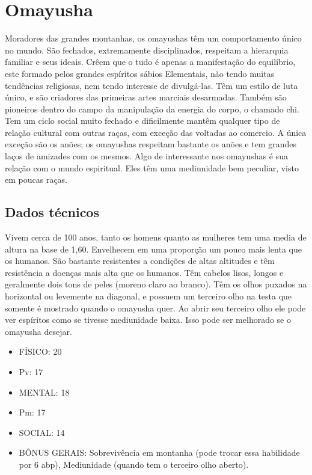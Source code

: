 \section{Omayusha}

Moradores das grandes montanhas, os omayushas têm um comportamento único no mundo. São fechados, extremamente disciplinados, respeitam a hierarquia familiar e seus ideais. Crêem que o tudo é apenas a manifestação do equilíbrio, este formado pelos grandes espíritos sábios Elementais, não tendo muitas tendências religiosas, nem tendo interesse de divulgá-las. Têm um estilo de luta único, e são criadores das primeiras artes marciais desarmadas. Também são pioneiros dentro do campo da manipulação da energia do corpo, o chamado chi.  Tem um ciclo social muito fechado e dificilmente mantêm qualquer tipo de relação cultural com outras raças, com exceção das voltadas ao comercio. A única exceção são os anões; os omayushas respeitam bastante os anões e tem grandes laços de amizades com os mesmos. Algo de interessante nos omayushas é sua relação com o mundo espiritual. Eles têm uma mediunidade bem peculiar, visto em poucas raças.

\subsection{Dados técnicos}

Vivem cerca de 100 anos, tanto os homens quanto as mulheres tem uma media de altura na base de 1,60. Envelhecem em uma proporção um pouco mais lenta que os humanos. São bastante resistentes a condições de altas altitudes e têm resistência a doenças mais alta que os humanos. Têm cabelos lisos, longos e geralmente dois tons de peles (moreno claro ao branco). Têm os olhos puxados na horizontal ou levemente na diagonal, e possuem um terceiro olho na testa que somente é mostrado quando o omayusha quer. Ao abrir seu terceiro olho ele pode ver espíritos como se tivesse mediunidade baixa. Isso pode ser melhorado se o omayusha desejar.

\begin{itemize}
	\item FÍSICO: 20
	\item Pv: 17 

	\item MENTAL: 18
	\item Pm: 17 

	\item SOCIAL: 14 

	\item BÔNUS GERAIS: Sobrevivência em montanha (pode trocar essa habilidade por 6 abp), Mediunidade (quando tem o terceiro olho aberto).
\end{itemize}

